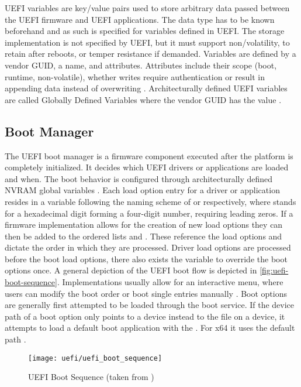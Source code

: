 \ac{UEFI} variables are key/value pairs used to store arbitrary data passed between the \ac{UEFI} firmware and \ac{UEFI} applications.
The data type has to be known beforehand and as such is specified for variables defined in \ac{UEFI}.
The storage implementation is not specified by \ac{UEFI}, but it must support non\-/volatility, to retain after reboots, or temper resistance if demanded.
Variables are defined by a vendor \ac{GUID}, a name, and attributes.
Attributes include their scope (boot, runtime, non-volatile), whether writes require authentication or result in appending data instead of overwriting \cite[Section 8.2]{uefi-spec}.
Architecturally defined \ac{UEFI} variables are called Globally Defined Variables where the vendor \ac{GUID} has the value  \cite[Section 3.3]{uefi-spec}.

\subsection{Boot Manager}
\label{sec:uefi-pi:uefi:boot-manager}

The \ac{UEFI} boot manager is a firmware component executed after the platform is completely initialized.
It decides which \ac{UEFI} drivers or applications are loaded and when.
The boot behavior is configured through architecturally defined \ac{NVRAM} global variables \cite[Section 3.1]{uefi-spec}.
Each load option entry for a driver or application resides in a variable following the naming scheme of  or  respectively, where \code{\#} stands for a hexadecimal digit forming a four-digit number, requiring leading zeros.
If a firmware implementation allows for the creation of new load options they can then be added to the ordered lists  and .
These reference the load options and dictate the order in which they are processed.
Driver load options are processed before the boot load options, there also exists the  variable to override the boot options once.
A general depiction of the \ac{UEFI} boot flow is depicted in \autoref{fig:uefi-boot-sequence}.
Implementations usually allow for an interactive menu, where users can modify the boot order or boot single entries manually \cite[Section 3.1.1]{uefi-spec}.
Boot options are generally first attempted to be loaded through the  boot service.
If the device path of a boot option only points to a device instead to the file on a device, it attempts to load a default boot application with the  \cite[Section 3.1.2]{uefi-spec}. For x64 it uses the default path  \cite[Section 3.5]{uefi-spec}.

\begin{figure}[htb]%
    \centering%
    \texttt{[image: uefi/uefi\_boot\_sequence]}%
    \caption[\acs{UEFI} Boot Sequence]{\acs{UEFI} Boot Sequence (taken from \cite[Figure 2-1]{uefi-spec})}%
    \label{fig:uefi-boot-sequence}%
\end{figure}
